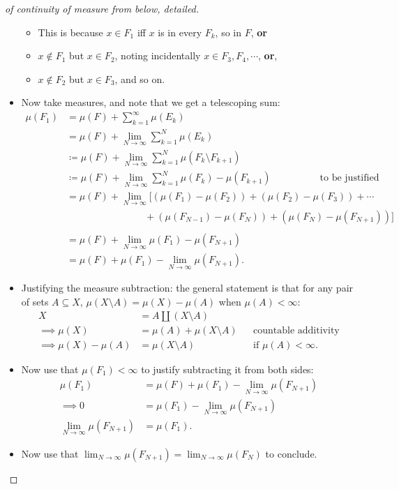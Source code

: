 \begin{proof}[of continuity of measure from below, detailed]
\begin{itemize}
  \begin{itemize}
  \tightlist
  \item
    This is because \(x\in F_1\) iff \(x\) is in every \(F_k\), so in
    \(F\), \textbf{or}
  \item
    \(x\not \in F_1\) but \(x\in F_2\), noting incidentally
    \(x\in F_3, F_4,\cdots\), \textbf{or},
  \item
    \(x\not\in F_2\) but \(x\in F_3\), and so on.
  \end{itemize}
\item
  Now take measures, and note that we get a telescoping sum:
  \begin{align*}
  \mu(F_1) 
  &= \mu(F) + \sum_{k=1}^\infty \mu(E_k) \\
  &= \mu(F) + \lim_{N\to\infty} \sum_{k=1}^N \mu(E_k) \\
  &\coloneqq\mu(F) + \lim_{N\to\infty} \sum_{k=1}^N \mu(F_k \setminus F_{k+1} ) \\
  &\coloneqq\mu(F) + \lim_{N\to\infty} \sum_{k=1}^N \mu(F_k) - \mu(F_{k+1} ) \hspace{5em}\text{to be justified}\\
  &= \mu(F) + \lim_{N\to\infty} 
  [
  (\mu(F_1) - \mu(F_2)) +  
  (\mu(F_2) - \mu(F_3)) +  
  \cdots \\ 
  & \hspace{8em} + (\mu(F_{N-1}) - \mu(F_N)) +  
  (\mu(F_N) - \mu(F_{N+1})) 
  ] \\ \\
  &= \mu(F) + \lim_{N\to\infty} \mu(F_1) - \mu(F_{N+1}) \\
  &= \mu(F) + \mu(F_1) - \lim_{N\to\infty} \mu(F_{N+1})
  .\end{align*}
\item
  Justifying the measure subtraction: the general statement is that for
  any pair of sets \(A\subseteq X\),
  \(\mu(X\setminus A) = \mu(X) - \mu(A)\) when \(\mu(A) < \infty\):
  \begin{align*}
  X &= A {\textstyle\coprod}(X\setminus A) \\
  \implies \mu(X) &= \mu(A) + \mu(X\setminus A) && \text{countable additivity} \\
  \implies \mu(X) -\mu(A) &= \mu(X\setminus A) && \text{if } \mu(A) < \infty 
  .\end{align*}
\item
  Now use that \(\mu(F_1)<\infty\) to justify subtracting it from both
  sides:
  \begin{align*}
  \mu(F_1)
  &= \mu(F) + \mu(F_1) - \lim_{N\to\infty} \mu(F_{N+1}) \\
  \implies
  0
  &= \mu(F_1) - \lim_{N\to\infty} \mu(F_{N+1}) \\
  \lim_{N\to\infty} \mu(F_{N+1})
  &= \mu(F_1) 
  .\end{align*}
\item
  Now use that
  \(\lim_{N\to\infty}\mu(F_{N+1}) = \lim_{N\to\infty} \mu(F_N)\) to
  conclude.
\end{itemize}

\end{proof}

